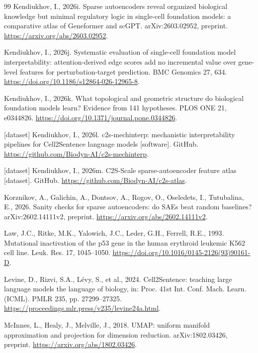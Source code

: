 \documentclass[review,authoryear,12pt]{elsarticle}
\begin{document}
\begin{thebibliography}{99}
 Kendiukhov, I., 2026i. Sparse autoencoders reveal organized biological knowledge but minimal regulatory logic in single-cell foundation models: a comparative atlas of Geneformer and scGPT. arXiv:2603.02952, preprint. \url{https://arxiv.org/abs/2603.02952}.

 Kendiukhov, I., 2026j. Systematic evaluation of single-cell foundation model interpretability: attention-derived edge scores add no incremental value over gene-level features for perturbation-target prediction. BMC Genomics 27, 634. \url{https://doi.org/10.1186/s12864-026-12965-8}.

 Kendiukhov, I., 2026k. What topological and geometric structure do biological foundation models learn? Evidence from 141 hypotheses. PLOS ONE 21, e0344826. \url{https://doi.org/10.1371/journal.pone.0344826}.

 [dataset] Kendiukhov, I., 2026l. c2s-mechinterp: mechanistic interpretability pipelines for Cell2Sentence language models [software]. GitHub. \url{https://github.com/Biodyn-AI/c2s-mechinterp}.

 [dataset] Kendiukhov, I., 2026m. C2S-Scale sparse-autoencoder feature atlas [dataset]. GitHub. \url{https://github.com/Biodyn-AI/c2s-atlas}.

 Korznikov, A., Galichin, A., Dontsov, A., Rogov, O., Oseledets, I., Tutubalina, E., 2026. Sanity checks for sparse autoencoders: do SAEs beat random baselines? arXiv:2602.14111v2, preprint. \url{https://arxiv.org/abs/2602.14111v2}.

 Law, J.C., Ritke, M.K., Yalowich, J.C., Leder, G.H., Ferrell, R.E., 1993. Mutational inactivation of the p53 gene in the human erythroid leukemic K562 cell line. Leuk. Res. 17, 1045--1050. \url{https://doi.org/10.1016/0145-2126(93)90161-D}.

 Levine, D., Rizvi, S.A., L\'evy, S., et al., 2024. Cell2Sentence: teaching large language models the language of biology, in: Proc. 41st Int. Conf. Mach. Learn. (ICML). PMLR 235, pp. 27299--27325. \url{https://proceedings.mlr.press/v235/levine24a.html}.

 McInnes, L., Healy, J., Melville, J., 2018. UMAP: uniform manifold approximation and projection for dimension reduction. arXiv:1802.03426, preprint. \url{https://arxiv.org/abs/1802.03426}.


\end{thebibliography}
\end{document}
